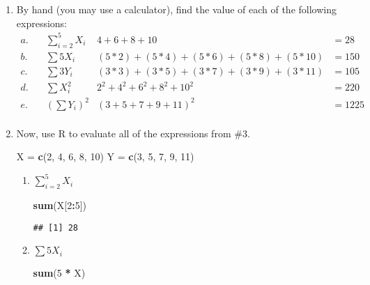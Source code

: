 \documentclass[]{article}
\newenvironment{Shaded}{\begin{snugshade}}{\end{snugshade}}
\newcommand{\KeywordTok}[1]{\textcolor[rgb]{0.13,0.29,0.53}{\textbf{#1}}}
\newcommand{\DecValTok}[1]{\textcolor[rgb]{0.00,0.00,0.81}{#1}}
\newcommand{\StringTok}[1]{\textcolor[rgb]{0.31,0.60,0.02}{#1}}
\newcommand{\OperatorTok}[1]{\textcolor[rgb]{0.81,0.36,0.00}{\textbf{#1}}}
\newcommand{\NormalTok}[1]{#1}
\begin{document}
\begin{enumerate}
\def\labelenumi{\arabic{enumi}.}
\setcounter{enumi}{2}
\item
  By hand (you may use a calculator), find the value of each of the
  following expressions:
  \begin{align*}  a.\quad & \displaystyle\sum_{i=2}^{5} X_i & 4 + 6 + 8 + 10 &= 28\\  b.\quad & \displaystyle\sum 5X_i & (5 * 2) + (5 * 4) + (5 * 6) + (5 * 8) + (5 * 10) &= 150\\  c.\quad & \displaystyle\sum 3Y_i & (3 * 3) + (3 * 5) + (3 * 7) + (3 * 9) + (3 * 11) &= 105\\  d.\quad & \displaystyle\sum X_i^2 & 2^2 + 4^2 + 6^2 + 8^2 + 10^2 &= 220\\  e.\quad & (\displaystyle\sum Y_i)^2 & (3 + 5 + 7 + 9 + 11)^2 &= 1225\\  \end{align*}
\item
  Now, use R to evaluate all of the expressions from \#3.

\begin{Shaded}
\begin{Highlighting}[]
\NormalTok{X =}\StringTok{ }\KeywordTok{c}\NormalTok{(}\DecValTok{2}\NormalTok{, }\DecValTok{4}\NormalTok{, }\DecValTok{6}\NormalTok{, }\DecValTok{8}\NormalTok{, }\DecValTok{10}\NormalTok{)}
\NormalTok{Y =}\StringTok{ }\KeywordTok{c}\NormalTok{(}\DecValTok{3}\NormalTok{, }\DecValTok{5}\NormalTok{, }\DecValTok{7}\NormalTok{, }\DecValTok{9}\NormalTok{, }\DecValTok{11}\NormalTok{)}
\end{Highlighting}
\end{Shaded}

  \begin{enumerate}
  \def\labelenumii{\alph{enumii}.}
  \item
    \(\displaystyle\sum_{i=2}^{5} X_i\)

\begin{Shaded}
\begin{Highlighting}[]
\KeywordTok{sum}\NormalTok{(X[}\DecValTok{2}\OperatorTok{:}\DecValTok{5}\NormalTok{])}
\end{Highlighting}
\end{Shaded}

\begin{verbatim}
## [1] 28
\end{verbatim}
  \item
    \(\displaystyle\sum 5X_i\)

\begin{Shaded}
\begin{Highlighting}[]
\KeywordTok{sum}\NormalTok{(}\DecValTok{5} \OperatorTok{*}\StringTok{ }\NormalTok{X)}
\end{Highlighting}
\end{Shaded}


\end{enumerate}
\end{enumerate}
\end{document}
